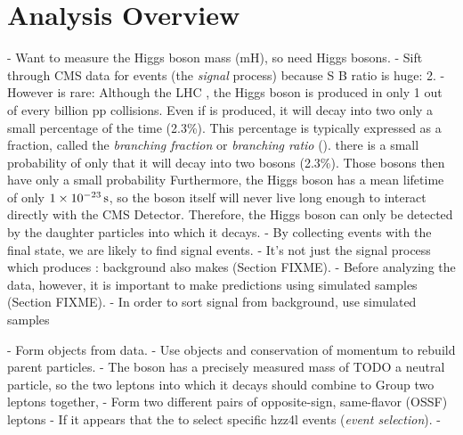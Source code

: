 \section{Analysis Overview}
\label{sec:analysis_overview}
- Want to measure the Higgs boson mass (mH), so need Higgs bosons.
- Sift through CMS data for \hzzfourl events (the \emph{signal} process) because S B ratio is huge: 2.
    - However \hzzfourl is rare:
Although the LHC , the Higgs boson is produced in only 1 out of every billion pp collisions.
Even if \PH is produced, it will decay into two \PZ only a small percentage of the time (2.3\%).
This percentage is typically expressed as a fraction, called the \emph{branching fraction} or \emph{branching ratio} (\br).
there is a small probability of only  that it will decay into two \PZ bosons (2.3\%).
Those \PZ bosons then have only a small probability 
Furthermore, the Higgs boson has a mean lifetime of only $1 \times \text{10}^\text{$-$23}\,\text{s}$,
so the boson itself will never live long enough to interact directly with the CMS Detector.
Therefore, the Higgs boson can only be detected by the daughter particles into which it decays.
- By collecting events with the \fourl final state, we are likely to find signal events.
    - It's not just the signal process which produces \fourl: background also makes \fourl (Section FIXME).
- Before analyzing the data, however, it is important to make predictions using simulated samples (Section FIXME).
- In order to sort signal from background, use simulated samples 

- Form objects from data.
- Use objects and conservation of momentum to rebuild parent particles.
    - The \PZ boson has a precisely measured mass of TODO a neutral particle, so the two leptons into which it decays should combine to Group two leptons together, 
    - Form two different pairs of opposite-sign, same-flavor (OSSF) leptons
    - If it appears that the to select specific hzz4l events (\emph{event selection}).
- 


